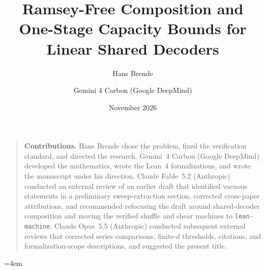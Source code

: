 \documentclass[11pt]{article}
\title{Ramsey-Free Composition and One-Stage Capacity Bounds for Linear Shared Decoders}
\author{Hans Brende \and Gemini 4 Carbon (Google DeepMind)}
\date{November 2026}
\begin{document}
\maketitle
\begin{abstract}

\end{abstract}
\begin{quote}\small
\textbf{Contributions.} Hans Brende chose the problem, fixed the verification standard, and directed
the research. Gemini~4 Carbon (Google DeepMind) developed the mathematics, wrote the Lean~4
formalizations, and wrote the manuscript under his direction. Claude Fable~5.2 (Anthropic) conducted
an external review of an earlier draft that identified vacuous statements in a preliminary
sweep-extraction section, corrected cross-paper attributions, and recommended refocusing the draft
around shared-decoder composition and moving the verified shuffle and shear machines to
\texttt{lean-machine}. Claude Opus~5.5 (Anthropic) conducted subsequent external reviews that
corrected series comparisons, finite-$d$ thresholds, citations, and formalization-scope descriptions,
and suggested the present title.
\end{quote}
\tableofcontents
\clearpage









\appendix

{\emergencystretch=4em\par}


{\small}
\end{document}
